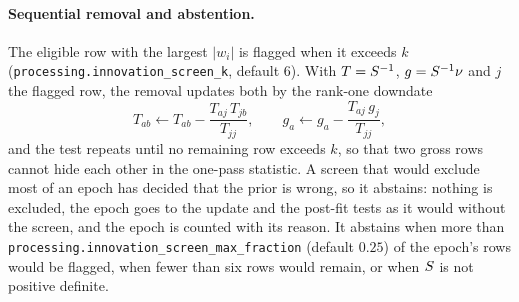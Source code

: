 \documentclass[main.tex]{subfiles}
\begin{document}
\paragraph{Sequential removal and abstention.}
The eligible row with the largest $|w_i|$ is flagged when it exceeds $k$
(\texttt{processing.innovation\_screen\_k}, default $6$).  With
$T = S^{-1}$, $g = S^{-1}\nu$ and $j$ the flagged row, the
removal updates both by the rank-one downdate
\begin{equation}
T_{ab} \leftarrow T_{ab} - \frac{T_{aj}\,T_{jb}}{T_{jj}},
\qquad
g_a \leftarrow g_a - \frac{T_{aj}\,g_j}{T_{jj}},
\label{eq:rt-screen-downdate}
\end{equation}
and the test repeats until no remaining row exceeds $k$, so that two gross rows
cannot hide each other in the one-pass statistic.  A screen that would exclude
most of an epoch has decided that the prior is wrong, so it abstains: nothing is
excluded, the epoch goes to the update and the post-fit tests as it would
without the screen, and the epoch is counted with its reason.  It abstains when
more than \texttt{processing.innovation\_screen\_max\_fraction} (default
$0.25$) of the epoch's rows would be flagged, when fewer than six rows would
remain, or when $S$ is not positive definite.
\end{document}
